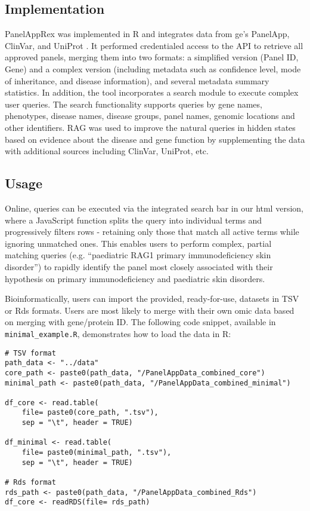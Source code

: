 \subsection{Implementation}
\noindent
PanelAppRex was implemented in R and integrates data from \ac{ge}’s PanelApp, ClinVar, and UniProt
\cite{martin_panelapp_2019,
landrum_clinvar_2018, the_uniprot_consortium_uniprot_2025}. 
It performed credentialed access to the API to retrieve all approved panels, merging them into two formats: a simplified version (Panel ID, Gene) and a complex version (including metadata such as confidence level, mode of inheritance, and disease information), and several metadata summary statistics. In addition, the tool incorporates a search module to execute complex user queries. The search functionality supports queries by gene names, phenotypes, disease names, disease groups, panel names, genomic locations and other identifiers. 
RAG was used to improve the natural queries in hidden states based on evidence about the disease and gene function by supplementing the data with additional sources including ClinVar, UniProt, etc. 

\subsection{Usage}
\noindent
Online, queries can be executed via the integrated search bar in our \ac{html} version, where a JavaScript function splits the query into individual terms and progressively filters rows - retaining only those that match all active terms while ignoring unmatched ones. This enables users to perform complex, partial matching queries (e.g. ``paediatric RAG1 primary immunodeficiency skin disorder'') to rapidly identify the panel most closely associated with their hypothesis on primary immunodeficiency and paediatric skin disorders.

Bioinformatically, users can import the provided, ready-for-use, datasets in TSV or Rds formats. Users are most likely to merge with their own omic data based on merging with gene/protein ID.
The following code snippet, available in \texttt{minimal\_example.R}, demonstrates how to load the data in R:
\begin{verbatim}
# TSV format
path_data <- "../data"
core_path <- paste0(path_data, "/PanelAppData_combined_core")
minimal_path <- paste0(path_data, "/PanelAppData_combined_minimal")

df_core <- read.table(
    file= paste0(core_path, ".tsv"), 
    sep = "\t", header = TRUE)

df_minimal <- read.table(
    file= paste0(minimal_path, ".tsv"), 
    sep = "\t", header = TRUE)

# Rds format
rds_path <- paste0(path_data, "/PanelAppData_combined_Rds")
df_core <- readRDS(file= rds_path)
\end{verbatim}


